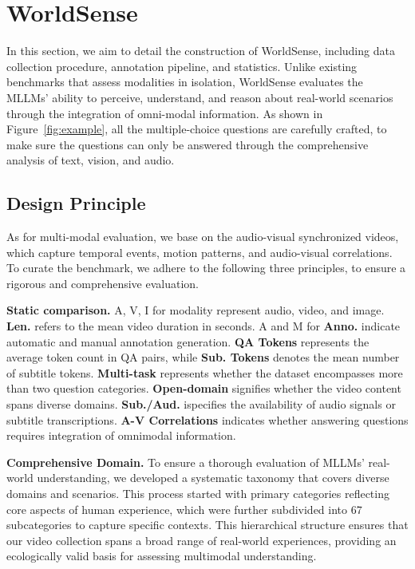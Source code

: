 
\section{WorldSense}
In this section, we aim to detail the construction of WorldSense, 
including data collection procedure, annotation pipeline, and statistics.
Unlike existing benchmarks that assess modalities in isolation, WorldSense evaluates the MLLMs’ ability to perceive, understand, and reason about real-world scenarios through the integration of omni-modal information. As shown in Figure~\ref{fig:example}, all the multiple-choice questions are carefully crafted, to make sure the questions can only be answered through the comprehensive analysis of text, vision, and audio.




\subsection{Design Principle} 
\label{sec:design}

As for multi-modal evaluation, we base on the audio-visual synchronized videos, 
which capture temporal events, motion patterns, and audio-visual correlations. 
To curate the benchmark, we adhere to the following three principles, to ensure a rigorous and comprehensive evaluation.

\begin{table*}[htbp]
  \caption{\textbf{Static comparison.} A, V, I for modality represent audio, video, and image. \textbf{Len.} refers to the mean video duration in seconds. A and M for \textbf{Anno.} indicate automatic and manual annotation generation. \textbf{QA Tokens} represents the average token count in QA pairs, while \textbf{Sub. Tokens} denotes the mean number of subtitle tokens. \textbf{Multi-task} represents whether the dataset encompasses more than two question categories. \textbf{Open-domain} signifies whether the video content spans diverse domains. \textbf{Sub./Aud.} ispecifies the availability of audio signals or subtitle transcriptions. \textbf{A-V Correlations} indicates whether answering questions requires integration of omnimodal information.}
  \label{tab:static}
  \centering
  \begin{adjustbox}{width=\textwidth}
    
  \end{adjustbox}
  \vspace{-4mm}
\end{table*}

\textbf{Comprehensive Domain.} 
To ensure a thorough evaluation of MLLMs’ real-world understanding, we developed a systematic taxonomy that covers diverse domains and scenarios. 
This process started with primary categories reflecting core aspects of human experience, which were further subdivided into 67 subcategories to capture specific contexts. 
This hierarchical structure ensures that our video collection spans a broad range of real-world experiences, providing an ecologically valid basis for assessing multimodal understanding.

